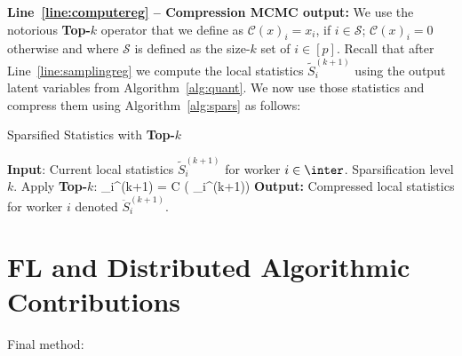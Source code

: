 \documentclass[11pt]{article}
\theoremstyle{t}
\begin{document}
\noindent \textbf{Line~\ref{line:computereg} -- Compression MCMC output:}
We use the notorious \textbf{Top-$k$} operator that we define as $\mathcal C(x)_i=x_i$, if $i\in \mathcal S$; $\mathcal C(x)_i=0$ otherwise and where $\mathcal S$ is defined as the size-$k$ set of $i\in[p]$.
Recall that after Line~\ref{line:samplingreg} we compute the local statistics $\tilde{S}_{i}^{(k+1)}$ using the output latent variables from Algorithm~\ref{alg:quant}.
We now use those statistics and compress them using Algorithm~\ref{alg:spars} as follows:

\begin{algorithm}[H]
\caption{Sparsified Statistics with \textbf{Top-$k$}} \label{alg:spars}
\begin{algorithmic}[1]
\STATE \textbf{Input}: Current local statistics $\tilde{S}_{i}^{(k+1)}$ for worker $i \in \inter$. Sparsification level $k$.
\STATE Apply \textbf{Top-$k$}:
\beq\label{eq:topkstats}
_{i}^{(k+1)} = \mathcal C \left( _{i}^{(k+1)}\right)
\eeq
\STATE \textbf{Output:} Compressed local statistics for worker $i$ denoted $\ddot{S}_{i}^{(k+1)}$.
\end{algorithmic}
\end{algorithm}


\section{FL and Distributed Algorithmic Contributions}
Final method:
\end{document}
